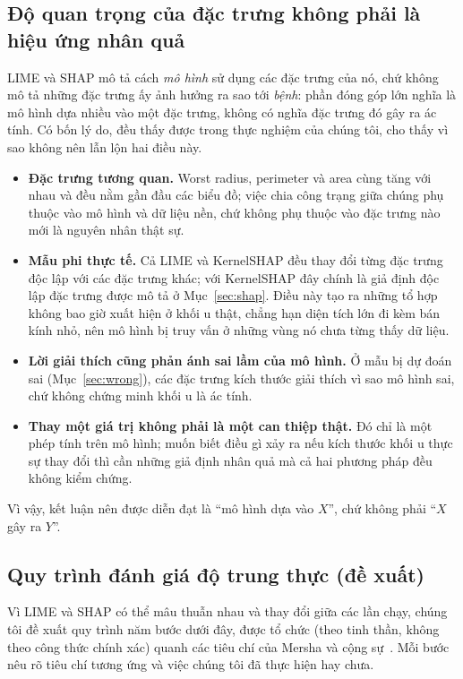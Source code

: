\documentclass[11pt,a4paper]{article}
\begin{document}
\subsection{Độ quan trọng của đặc trưng không phải là hiệu ứng nhân quả}
\label{sec:causal}
LIME và SHAP mô tả cách \emph{mô hình} sử dụng các đặc trưng của nó, chứ
không mô tả những đặc trưng ấy ảnh hưởng ra sao tới \emph{bệnh}: phần đóng
góp lớn nghĩa là mô hình dựa nhiều vào một đặc trưng, không có nghĩa đặc
trưng đó gây ra ác tính. Có bốn lý do, đều thấy được trong thực nghiệm của
chúng tôi, cho thấy vì sao không nên lẫn lộn hai điều này.

\begin{itemize}
  \item \textbf{Đặc trưng tương quan.} Worst radius, perimeter và area cùng
        tăng với nhau và đều nằm gần đầu các biểu đồ; việc chia công trạng
        giữa chúng phụ thuộc vào mô hình và dữ liệu nền, chứ không phụ thuộc
        vào đặc trưng nào mới là nguyên nhân thật sự.
  \item \textbf{Mẫu phi thực tế.} Cả LIME và KernelSHAP đều thay đổi từng đặc
        trưng độc lập với các đặc trưng khác; với KernelSHAP đây chính là giả
        định độc lập đặc trưng được mô tả ở Mục~\ref{sec:shap}. Điều này tạo
        ra những tổ hợp không bao giờ xuất hiện ở khối u thật, chẳng hạn diện
        tích lớn đi kèm bán kính nhỏ, nên mô hình bị truy vấn ở những vùng nó
        chưa từng thấy dữ liệu.
  \item \textbf{Lời giải thích cũng phản ánh sai lầm của mô hình.} Ở mẫu bị
        dự đoán sai (Mục~\ref{sec:wrong}), các đặc trưng kích thước giải
        thích vì sao mô hình sai, chứ không chứng minh khối u là ác tính.
  \item \textbf{Thay một giá trị không phải là một can thiệp thật.} Đó chỉ là
        một phép tính trên mô hình; muốn biết điều gì xảy ra nếu kích thước
        khối u thực sự thay đổi thì cần những giả định nhân quả mà cả hai
        phương pháp đều không kiểm chứng.
\end{itemize}
Vì vậy, kết luận nên được diễn đạt là ``mô hình dựa vào $X$'', chứ không phải
``$X$ gây ra $Y$''.

\subsection{Quy trình đánh giá độ trung thực (đề xuất)}\label{sec:proc}
Vì LIME và SHAP có thể mâu thuẫn nhau và thay đổi giữa các lần chạy, chúng
tôi đề xuất quy trình năm bước dưới đây, được tổ chức (theo tinh thần, không
theo công thức chính xác) quanh các tiêu chí của Mersha và cộng
sự~\cite{mersha}. Mỗi bước nêu rõ tiêu chí tương ứng và việc chúng tôi đã
thực hiện hay chưa.
\end{document}
